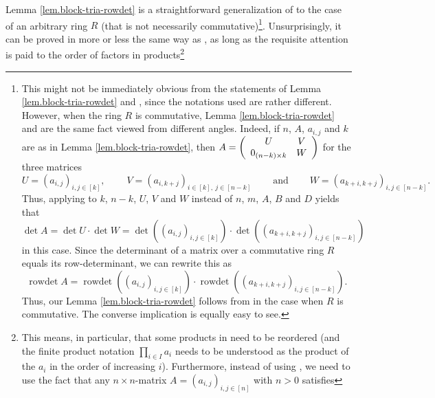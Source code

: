 \documentclass[numbers=enddot,12pt,final,onecolumn,notitlepage,english]{scrartcl}%
\theoremstyle{definition}
\let\prodnonlimits\prod
\renewcommand{\prod}{\prodnonlimits\limits}
\newenvironment{verlong}{}{}
\begin{document}
\begin{verlong}
Lemma \ref{lem.block-tria-rowdet} is a straightforward generalization of
\cite[Exercise 6.29]{detnotes} to the case of an arbitrary ring $R$ (that is
not necessarily commutative)\footnote{This might not be immediately obvious
from the statements of Lemma \ref{lem.block-tria-rowdet} and \cite[Exercise
6.29]{detnotes}, since the notations used are rather different. However, when
the ring $R$ is commutative, Lemma \ref{lem.block-tria-rowdet} and
\cite[Exercise 6.29]{detnotes} are the same fact viewed from different angles.
Indeed, if $n$, $A$, $a_{i,j}$ and $k$ are as in Lemma
\ref{lem.block-tria-rowdet}, then $A=\left(
\begin{array}
[c]{cc}%
U & V\\
0_{\left(  n-k\right)  \times k} & W
\end{array}
\right)  $ for the three matrices%
\[
U=\left(  a_{i,j}\right)  _{i,j\in\left[  k\right]  }%
,\ \ \ \ \ \ \ \ \ \ V=\left(  a_{i,k+j}\right)  _{i\in\left[  k\right]
,\ j\in\left[  n-k\right]  }\ \ \ \ \ \ \ \ \ \ \text{and}%
\ \ \ \ \ \ \ \ \ \ W=\left(  a_{k+i,k+j}\right)  _{i,j\in\left[  n-k\right]
}.
\]
Thus, applying \cite[Exercise 6.29]{detnotes} to $k$, $n-k$, $U$, $V$ and $W$
instead of $n$, $m$, $A$, $B$ and $D$ yields that%
\[
\det A=\det U\cdot\det W=\det\left(  \left(  a_{i,j}\right)  _{i,j\in\left[
k\right]  }\right)  \cdot\det\left(  \left(  a_{k+i,k+j}\right)
_{i,j\in\left[  n-k\right]  }\right)
\]
in this case. Since the determinant of a matrix over a commutative ring $R$
equals its row-determinant, we can rewrite this as%
\[
\operatorname*{rowdet}A=\operatorname*{rowdet}\left(  \left(  a_{i,j}\right)
_{i,j\in\left[  k\right]  }\right)  \cdot\operatorname*{rowdet}\left(  \left(
a_{k+i,k+j}\right)  _{i,j\in\left[  n-k\right]  }\right)  .
\]
Thus, our Lemma \ref{lem.block-tria-rowdet} follows from \cite[Exercise
6.29]{detnotes} in the case when $R$ is commutative. The converse implication
is equally easy to see.}. Unsurprisingly, it can be proved in more or less the
same way as \cite[Exercise 6.29]{detnotes}, as long as the requisite attention
is paid to the order of factors in products\footnote{This means, in
particular, that some products in \cite[solution to Exercise 6.29]{detnotes}
need to be reordered (and the finite product notation $\prod_{i\in I}a_{i}$
needs to be understood as the product of the $a_{i}$ in the order of
increasing $i$). Furthermore, instead of using \cite[Theorem 6.82
\textbf{(a)}]{detnotes}, we need to use the fact that any $n\times n$-matrix
$A=\left(  a_{i,j}\right)  _{i,j\in\left[  n\right]  }$ with $n>0$ satisfies%
}
\end{verlong}
\end{document}
